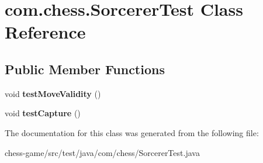 \hypertarget{classcom_1_1chess_1_1_sorcerer_test}{}\section{com.\+chess.\+Sorcerer\+Test Class Reference}
\label{classcom_1_1chess_1_1_sorcerer_test}
\subsection*{Public Member Functions}
\begin{DoxyCompactItemize}
\item 
\mbox{\label{classcom_1_1chess_1_1_sorcerer_test_ae65d3830bb0e958cc04b7fb813fb52ff}} 
void {\bfseries test\+Move\+Validity} ()
\item 
\mbox{\label{classcom_1_1chess_1_1_sorcerer_test_a66da3303c73df187527ab375c0649793}} 
void {\bfseries test\+Capture} ()
\end{DoxyCompactItemize}


The documentation for this class was generated from the following file\+:\begin{DoxyCompactItemize}
\item 
chess-\/game/src/test/java/com/chess/Sorcerer\+Test.\+java\end{DoxyCompactItemize}
